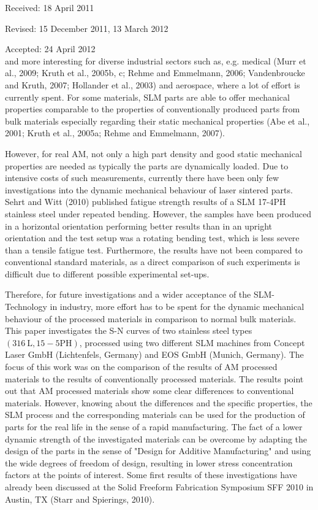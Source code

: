 \documentclass[10pt]{article}
\begin{document}
Received: 18 April 2011

Revised: 15 December 2011, 13 March 2012

Accepted: 24 April 2012\\
and more interesting for diverse industrial sectors such as, e.g. medical (Murr et al., 2009; Kruth et al., 2005b, c; Rehme and Emmelmann, 2006; Vandenbroucke and Kruth, 2007; Hollander et al., 2003) and aerospace, where a lot of effort is currently spent. For some materials, SLM parts are able to offer mechanical properties comparable to the properties of conventionally produced parts from bulk materials especially regarding their static mechanical properties (Abe et al., 2001; Kruth et al., 2005a; Rehme and Emmelmann, 2007).

However, for real AM, not only a high part density and good static mechanical properties are needed as typically the parts are dynamically loaded. Due to intensive costs of such measurements, currently there have been only few investigations into the dynamic mechanical behaviour of laser sintered parts. Sehrt and Witt (2010) published fatigue strength results of a SLM 17-4PH stainless steel under repeated bending. However, the samples have been produced in a horizontal orientation performing better results than in an upright orientation and the test setup was a rotating bending test, which is less severe than a tensile fatigue test. Furthermore, the results have not been compared to conventional standard materials, as a direct comparison of such experiments is difficult due to different possible experimental set-ups.

Therefore, for future investigations and a wider acceptance of the SLM-Technology in industry, more effort has to be spent for the dynamic mechanical behaviour of the processed materials in comparison to normal bulk materials. This paper investigates the S-N curves of two stainless steel types $(316 \mathrm{~L}, 15-5 \mathrm{PH})$, processed using two different SLM machines from Concept Laser GmbH (Lichtenfels, Germany) and EOS GmbH (Munich, Germany). The focus of this work was on the comparison of the results of AM processed materials to the results of conventionally processed materials. The results point out that AM processed materials show some clear differences to conventional materials. However, knowing about the differences and the specific properties, the SLM process and the corresponding materials can be used for the production of parts for the real life in the sense of a rapid manufacturing. The fact of a lower dynamic strength of the investigated materials can be overcome by adapting the design of the parts in the sense of "Design for Additive Manufacturing" and using the wide degrees of freedom of design, resulting in lower stress concentration factors at the points of interest. Some first results of these investigations have already been discussed at the Solid Freeform Fabrication Symposium SFF 2010 in Austin, TX (Starr and Spierings, 2010).
\end{document}
